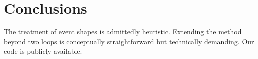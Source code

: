\section{Conclusions}\label{sec:conclusions}

The treatment of event shapes is admittedly heuristic. Extending the
method beyond two loops is conceptually straightforward but technically
demanding. Our code is publicly available.

